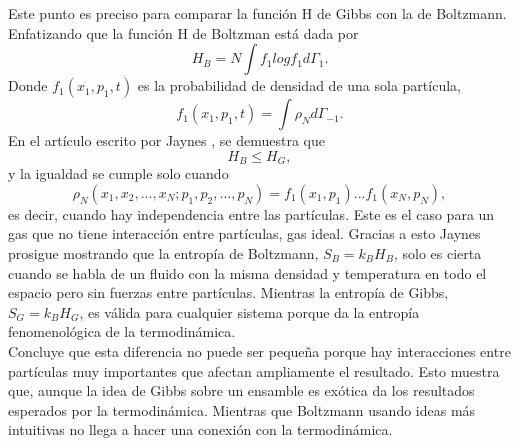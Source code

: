 Este punto es preciso para comparar la función H de Gibbs con la de Boltzmann. Enfatizando  que la función H de Boltzman está dada por
\begin{equation}
H_{B}=N \int f_{1} log f_{1} d\Gamma_{1}.
\end{equation}
Donde $f_{1}(x_{1},p_{1},t)$ es la probabilidad de densidad de una sola partícula, 
\begin{equation}
f_{1}(x_{1},p_{1},t)= \int \rho_{N} d \Gamma_{-1}.
\end{equation}
En el artículo escrito por Jaynes \cite{JaynesEntropies}, se demuestra que
\begin{equation}
H_{B} \leq H_{G},
\end{equation}
y la igualdad se cumple solo cuando 
\begin{equation}
\rho_{N}(x_{1},x_{2},...,x_{N};p_{1},p_{2},...,p_{N})=f_{1}(x_{1},p_{1})...f_{1}(x_{N},p_{N}),
\end{equation}
es decir, cuando hay independencia entre las partículas. Este es el caso para un gas que no tiene interacción entre partículas, gas ideal. Gracias a esto Jaynes prosigue mostrando que la entropía de Boltzmann, $S_{B}=k_{B}H_{B}$, solo es cierta cuando se habla de un fluido con la misma densidad y temperatura en todo el espacio pero sin fuerzas entre partículas. Mientras la entropía de Gibbs, $S_{G}=k_{B}H_{G}$, es válida para cualquier sistema porque da la entropía fenomenológica de la termodinámica.
\\
Concluye que esta diferencia no puede ser pequeña porque hay interacciones entre partículas muy importantes que afectan ampliamente el resultado. Esto muestra que, aunque la idea de Gibbs sobre un ensamble es exótica da los resultados esperados por la termodinámica. Mientras que Boltzmann usando ideas más intuitivas no llega a hacer una conexión con la termodinámica.

